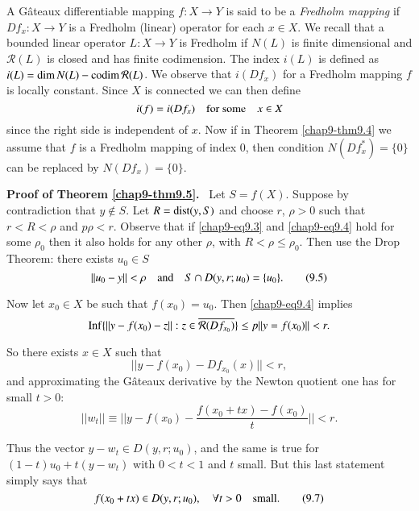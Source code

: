 \begin{remark}\label{chap9-rem4}
A G\^ateaux differentiable mapping $f:X\to Y$ is said to be a {\em
  Fredholm mapping} if $Df_{x}:X\to Y$ is a Fredholm (linear) operator
for each $x\in X$. We recall that a bounded linear operator $L:X\to Y$
is Fredholm if $N(L)$ is finite dimensional and $\mathcal{R}(L)$ is
closed and has finite codimension. The index $i(L)$ is defined as
$i(L)=\dim N(L)-\operatorname{codim} \mathcal{R}(L)$. We observe that $i(Df_{x})$
for a Fredholm mapping $f$ is locally constant. Since $X$ is connected
we can then define
$$
i(f)=i(Df_{x})\quad\text{for some}\quad x\in X
$$
since the right side is independent of $x$. Now if in Theorem
\ref{chap9-thm9.4} we assume that $f$ is a Fredholm mapping of index
$0$, then condition $N(Df^{*}_{x})=\{0\}$ can be replaced by
$N(Df_{x})=\{0\}$. 
\end{remark}

\noindent
{\bf Proof of Theorem \ref{chap9-thm9.5}.}~ Let $S=f(X)$. Suppose by
contradiction that $y\not\in S$. Let $R=\operatorname{dist} (y,S)$ and choose $r$,
$\rho>0$ such that $r<R<\rho$ and $p\rho<r$. Observe that if
\eqref{chap9-eq9.3} and \eqref{chap9-eq9.4} hold for some $\rho_{0}$
then it also holds for any other $\rho$, with $R<\rho\leq
\rho_{0}$. Then use the Drop Theorem: there exists $u_{0}\in S$
\begin{equation*}
||u_{0}-y||<\rho\quad\text{and}\quad S\cap
D(y,r;u_{0})=\{u_{0}\}.\tag{9.5}\label{chap9-eq9.5} 
\end{equation*}

Now let $x_{0}\in X$ be such that $f(x_{0})=u_{0}$. Then
\eqref{chap9-eq9.4} implies
$$
\operatorname{Inf}\{||y-f(x_{0})-z||:z\in \overline{\mathcal{R}(Df_{x_{0}})}\}\leq
p||y=f(x_{0})||<r. 
$$

So there exists $x\in X$ such that
\begin{equation*}
||y-f(x_{0})-Df_{x_{0}}(x)||<r,\tag{9.6}\label{chap9-eq9.6}
\end{equation*}
and approximating the G\^ateaux derivative by the Newton quotient one
has for small $t>0$:
$$
||w_{t}||\equiv ||y-f(x_{0})-\frac{f(x_{0}+tx)-f(x_{0})}{t}||<r.
$$

Thus the vector $y-w_{t}\in D(y,r;u_{0})$, and the same is true for
$(1-t)u_{0}+t(y-w_{t})$ with $0<t<1$ and $t$ small. But this last
statement simply says that
\begin{equation*}
f(x_{0}+tx)\in D(y,r;u_{0}),\quad \forall
t>0\quad\text{small}.\tag{9.7}\label{chap9-eq9.7} 
\end{equation*}


